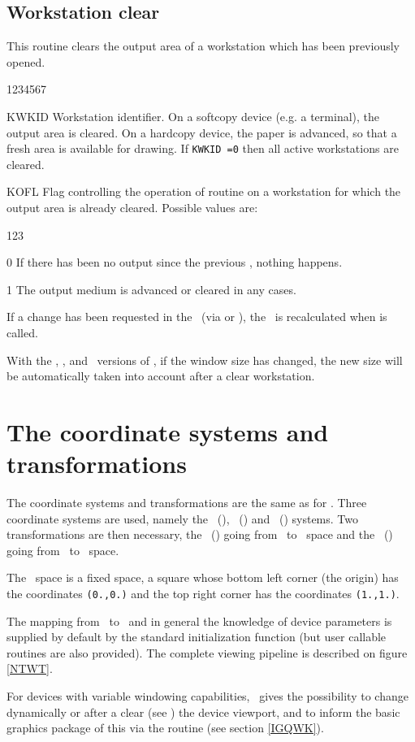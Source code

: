 \subsection{Workstation clear}
\Action
This routine clears the output area of a workstation which has been previously
opened.
\Pdesc
\begin{DLtt}{1234567}
\item[KWKID] Workstation identifier. On a softcopy device (e.g. a terminal), the
             output area is cleared. On a hardcopy device, the paper is
	     advanced, so that a fresh area is available for drawing. If
	     {\tt KWKID =0} then all active workstations are cleared.
\item[KOFL] Flag controlling the operation of routine  on a
            workstation for which the output area is already cleared. Possible
	    values are:
\begin{DLtt}{123}
\item[0] If there has been no output since the previous ,
         nothing happens.
\item[1] The output medium is advanced or cleared in any cases.
\end{DLtt}
\end{DLtt}
If a change has been requested in the \WT~(via  or ),
the \WT~is recalculated when  is called.

With the \GPR, \GL, and ~versions of \HIGZ, if the window size has changed,
the new size will be automatically taken into account after a clear workstation.
%
%
\section{The coordinate systems and transformations}
The coordinate systems and transformations are the same as for \GKS.
Three coordinate systems are used, namely the \WC~(\wc), \NDC~(\ndc) and
\DC~(\dc) systems. Two transformations are then necessary, the \NT~(\nt) going
from \WC~to \NDC~space and the \WT~(\wt) going from \NDC~to \DC~space.
\par
The \NDC~space is a fixed space, a square whose bottom left corner
(the origin) has the coordinates {\tt(0.,0.)} and the top right corner
has the coordinates {\tt(1.,1.)}.
\par
The mapping from \NDC~to \DC~and in general the knowledge of
device parameters is supplied by default by the standard initialization
function (but user callable routines are also provided).
The complete viewing pipeline is described on figure \ref{NTWT}.
\par
For devices with variable windowing capabilities, \HIGZ~gives the possibility
to change dynamically or after a clear (see ) the device viewport,
and to inform the basic graphics package of this via the routine 
(see section \ref{IGQWK}).

